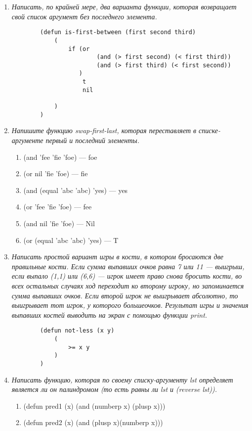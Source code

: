 \begin{enumerate}[wide=0pt]
\begin{lstlisting}
			)
		)
	\end{lstlisting}

	\item  \textit{Написать, по крайней мере, два варианта функции, 
	которая возвращает
	свой список аргумент без последнего элемента.}

	\begin{lstlisting}
		(defun is-first-between (first second third)
			(
				if (or 
						(and (> first second) (< first third))
						(and (> first third) (< first second))
				   )
					t
					nil
				
			)
		)
	\end{lstlisting}

	\item  \textit{Напишите функцию swap-first-last, 
	которая переставляет в списке-
	аргументе первый и последний элементы.}
	
		\begin{enumerate}[label=\arabic*)]
			\item (and 'fee 'fie 'foe) --- foe
			\item (or nil 'fie 'foe) --- fie
			\item (and (equal 'abc 'abc) 'yes) --- yes
			\item (or 'fee 'fie 'foe) --- fee
			\item (and nil 'fie 'foe) --- Nil
			\item (or (equal 'abc 'abc) 'yes) --- T
		\end{enumerate}

	\item  \textit{Написать простой вариант игры в кости, в котором бросаются две
	правильные кости. Если сумма выпавших очков равна 7 или 11 —
	выигрыш, если выпало (1,1) или (6,6) — игрок имеет право снова
	бросить кости, во всех остальных случаях ход переходит ко второму
	игроку, но запоминается сумма выпавших очков. Если второй игрок не
	выигрывает абсолютно, то выигрывает тот игрок, у которого большеочков. Результат игры и значения выпавших костей выводить на экран с
	помощью функции print.}

	\begin{lstlisting}
		(defun not-less (x y)
			(
				>= x y
			)
		)
	\end{lstlisting}

	\item  \textit{Написать функцию, которая по своему 
	списку-аргументу lst определяет
	является ли он палиндромом (то есть равны ли lst и (reverse lst)).}
	
		\begin{enumerate}[label=\arabic*)]
			\item (defun pred1 (x) (and (numberp x) (plusp x)))
			\item (defun pred2 (x) (and (plusp x)(numberp x)))
		\end{enumerate}


\end{enumerate}
